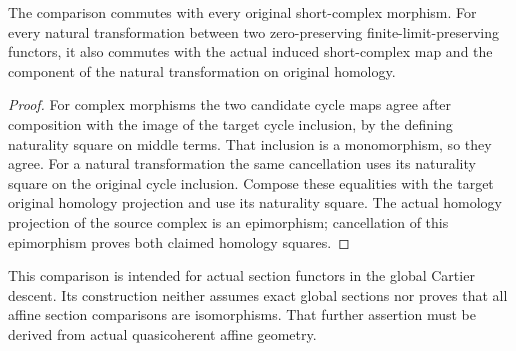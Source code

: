 \begin{proposition}
\label{prop:left-exact-original-homology-comparison-naturality}
\leanok
{}
The comparison commutes with every original short-complex
morphism. For every natural transformation between two
zero-preserving finite-limit-preserving functors, it also
commutes with the actual induced short-complex map and the
component of the natural transformation on original homology.
\end{proposition}
\begin{proof}
For complex morphisms the two candidate cycle maps agree after
composition with the image of the target cycle inclusion, by
the defining naturality square on middle terms. That inclusion
is a monomorphism, so they agree. For a natural transformation
the same cancellation uses its naturality square on the
original cycle inclusion. Compose these equalities with the
target original homology projection and use its naturality
square. The actual homology projection of the source complex
is an epimorphism; cancellation of this epimorphism proves
both claimed homology squares.
\end{proof}

This comparison is intended for actual section functors in the
global Cartier descent. Its construction neither assumes exact
global sections nor proves that all affine section comparisons
are isomorphisms. That further assertion must be derived from
actual quasicoherent affine geometry.
